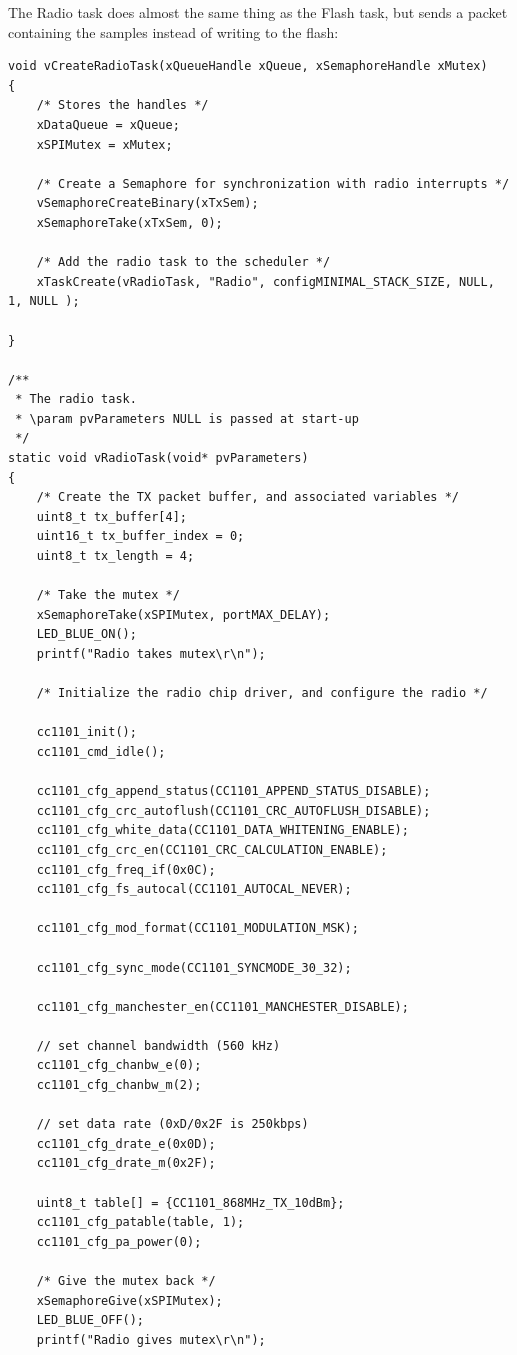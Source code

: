 \documentclass[11pt]{report}
\begin{document}
The Radio task does almost the same thing as the Flash task, but sends a packet containing the samples instead of writing to the flash:
\begin{verbatim}
void vCreateRadioTask(xQueueHandle xQueue, xSemaphoreHandle xMutex)
{
    /* Stores the handles */
    xDataQueue = xQueue;
    xSPIMutex = xMutex;

    /* Create a Semaphore for synchronization with radio interrupts */
    vSemaphoreCreateBinary(xTxSem);
    xSemaphoreTake(xTxSem, 0);

    /* Add the radio task to the scheduler */
    xTaskCreate(vRadioTask, "Radio", configMINIMAL_STACK_SIZE, NULL, 1, NULL );

}

/**
 * The radio task.
 * \param pvParameters NULL is passed at start-up
 */
static void vRadioTask(void* pvParameters)
{
    /* Create the TX packet buffer, and associated variables */
    uint8_t tx_buffer[4];
    uint16_t tx_buffer_index = 0;
    uint8_t tx_length = 4;

    /* Take the mutex */
    xSemaphoreTake(xSPIMutex, portMAX_DELAY);
    LED_BLUE_ON();
    printf("Radio takes mutex\r\n");

    /* Initialize the radio chip driver, and configure the radio */

    cc1101_init();
    cc1101_cmd_idle();

    cc1101_cfg_append_status(CC1101_APPEND_STATUS_DISABLE);
    cc1101_cfg_crc_autoflush(CC1101_CRC_AUTOFLUSH_DISABLE);
    cc1101_cfg_white_data(CC1101_DATA_WHITENING_ENABLE);
    cc1101_cfg_crc_en(CC1101_CRC_CALCULATION_ENABLE);
    cc1101_cfg_freq_if(0x0C);
    cc1101_cfg_fs_autocal(CC1101_AUTOCAL_NEVER);

    cc1101_cfg_mod_format(CC1101_MODULATION_MSK);

    cc1101_cfg_sync_mode(CC1101_SYNCMODE_30_32);

    cc1101_cfg_manchester_en(CC1101_MANCHESTER_DISABLE);

    // set channel bandwidth (560 kHz)
    cc1101_cfg_chanbw_e(0);
    cc1101_cfg_chanbw_m(2);

    // set data rate (0xD/0x2F is 250kbps)
    cc1101_cfg_drate_e(0x0D);
    cc1101_cfg_drate_m(0x2F);

    uint8_t table[] = {CC1101_868MHz_TX_10dBm};
    cc1101_cfg_patable(table, 1);
    cc1101_cfg_pa_power(0);

    /* Give the mutex back */
    xSemaphoreGive(xSPIMutex);
    LED_BLUE_OFF();
    printf("Radio gives mutex\r\n");


\end{verbatim}
\end{document}
